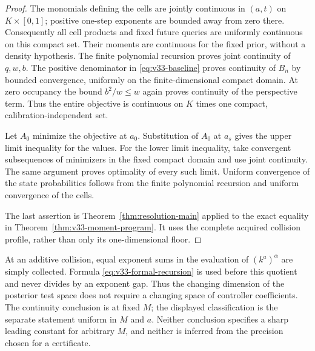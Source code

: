 \begin{proof}
The monomials defining the cells are jointly continuous in $(a,t)$
on $K\times[0,1]$; positive one-step exponents are bounded away
from zero there. Consequently all cell products and fixed future
queries are uniformly continuous on this compact set. Their moments
are continuous for the fixed prior, without a density hypothesis.
The finite polynomial recursion proves joint continuity of $q,w,b$.
The positive denominator in \eqref{eq:v33-baseline} proves continuity
of $B_n$ by bounded convergence, uniformly on the finite-dimensional
compact domain. At zero occupancy the bound $b^2/w\le w$ again
proves continuity of the perspective term. Thus the entire objective
is continuous on $K$ times one compact, calibration-independent set.

Let $A_0$ minimize the objective at $a_0$. Substitution of $A_0$
at $a_s$ gives the upper limit inequality for the values. For the
lower limit inequality, take convergent subsequences of minimizers
in the fixed compact domain and use joint continuity. The same
argument proves optimality of every such limit. Uniform convergence
of the state probabilities follows from the finite polynomial
recursion and uniform convergence of the cells.

The last assertion is Theorem~\ref{thm:resolution-main} applied to
the exact equality in Theorem~\ref{thm:v33-moment-program}. It uses
the complete acquired collision profile, rather than only its
one-dimensional floor.
\end{proof}

At an additive collision, equal exponent sums in the evaluation of
$(k^a)^\alpha$ are simply collected. Formula
\eqref{eq:v33-formal-recursion} is used before this quotient and
never divides by an exponent gap. Thus the changing dimension of the
posterior test space does not require a changing space of controller
coefficients. The continuity conclusion is at fixed $M$; the displayed
classification is the separate statement uniform in $M$ and $a$.
Neither conclusion specifies a sharp leading constant for arbitrary
$M$, and neither is inferred from the precision chosen for a
certificate.
